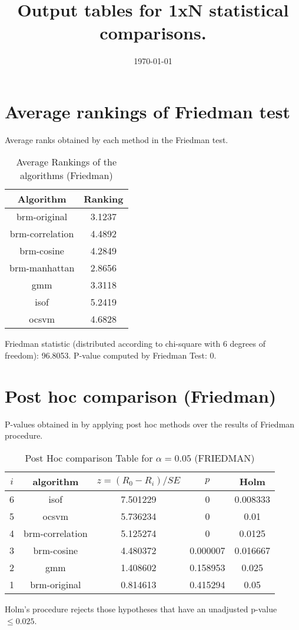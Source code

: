 \documentclass[a4paper,10pt]{article}
\title{Output tables for 1xN statistical comparisons.}
\author{}
\date{\today}
\begin{document}
\begin{landscape}
\pagestyle{empty}
\maketitle
\thispagestyle{empty}

\section{Average rankings of Friedman test}


Average ranks obtained by each method in the Friedman test.

\begin{table}[!htp]
\centering
\begin{tabular}{|c|c|}\hline
Algorithm&Ranking\\\hline
brm-original&3.1237\\brm-correlation&4.4892\\brm-cosine&4.2849\\brm-manhattan&2.8656\\gmm&3.3118\\isof&5.2419\\ocsvm&4.6828\\\hline\end{tabular}
\caption{Average Rankings of the algorithms (Friedman)}
\end{table}

Friedman statistic (distributed according to chi-square with 6 degrees of freedom): 96.8053. \newline P-value computed by Friedman Test: 0.\newline


\newpage

\section{Post hoc comparison (Friedman)}


P-values obtained in by applying post hoc methods over the results of Friedman procedure.

\begin{table}[!htp]
\centering\footnotesize
\begin{tabular}{ccccc}
$i$&algorithm&$z=(R_0 - R_i)/SE$&$p$&Holm \\
\hline6&isof&7.501229&0&0.008333\\5&ocsvm&5.736234&0&0.01\\4&brm-correlation&5.125274&0&0.0125\\3&brm-cosine&4.480372&0.000007&0.016667\\2&gmm&1.408602&0.158953&0.025\\1&brm-original&0.814613&0.415294&0.05\\\hline
\end{tabular}
\caption{Post Hoc comparison Table for $\alpha=0.05$ (FRIEDMAN)}
\end{table}Holm's procedure rejects those hypotheses that have an unadjusted p-value $\le0.025$.



\end{landscape}
\end{document}
